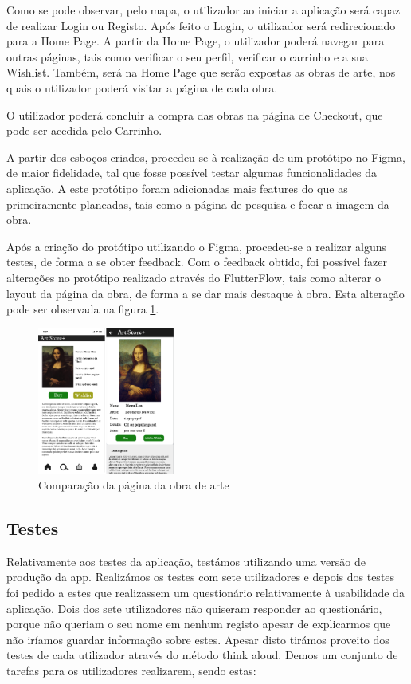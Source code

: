 \documentclass[conference]{IEEEtran}
\begin{document}
Como se pode observar, pelo mapa, o utilizador ao iniciar a aplicação será capaz de realizar Login ou Registo. 
Após feito o Login, o utilizador será redirecionado para a Home Page. A partir da Home Page, o utilizador poderá 
navegar para outras páginas, tais como verificar o seu perfil, verificar o carrinho e a sua Wishlist. Também, 
será na Home Page que serão expostas as obras de arte, nos quais o utilizador poderá visitar a página de cada obra. 

O utilizador poderá concluir a compra das obras na página de Checkout, que pode ser acedida pelo Carrinho.

A partir dos esboços criados, procedeu-se à realização de um protótipo no Figma, de maior fidelidade, tal que 
fosse possível testar algumas funcionalidades da aplicação. A este protótipo foram adicionadas mais features do 
que as primeiramente planeadas, tais como a página de pesquisa e focar a imagem da obra.

Após a criação do protótipo utilizando o Figma, procedeu-se a realizar alguns testes, de forma a se obter feedback. 
Com o feedback obtido, foi possível fazer alterações no protótipo realizado através do FlutterFlow, tais como 
alterar o layout da página da obra, de forma a se dar mais destaque à obra. Esta alteração pode ser observada na 
figura \ref{fig:earlyvslate}.

\begin{figure}[h]
    \centering
    \includegraphics[width=0.4\textwidth]{artpiece-early-vs-latest.png}
    \caption{Comparação da página da obra de arte}
    \label{fig:earlyvslate}
\end{figure}



\subsection{Testes}

Relativamente aos testes da aplicação, testámos utilizando uma versão de produção da app. Realizámos os testes com sete utilizadores e depois dos testes foi pedido a estes que realizassem um questionário relativamente à usabilidade da aplicação. Dois dos sete utilizadores não quiseram responder ao questionário, porque não queriam o seu nome em nenhum registo apesar de explicarmos que não iríamos guardar informação sobre estes. Apesar disto tirámos proveito dos testes de cada utilizador através do método think aloud. Demos um conjunto de tarefas para os utilizadores realizarem, sendo estas:
\end{document}

